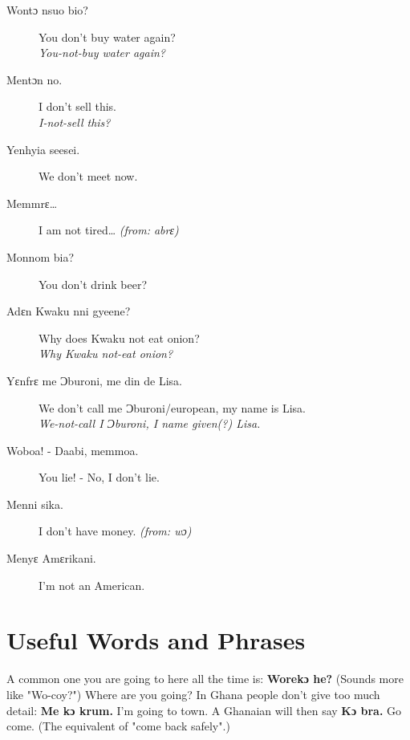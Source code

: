 \documentclass[%
 fontsize=11pt,%
 a5paper,pagesize,
 paper=a5,%
 DIV=9,%
 parskip=half*,%
 twoside=true,
 pointlessnumbers
]{scrbook}%
\begin{document}
\begin{description}
  \item[Wontɔ nsuo bio?] You don't buy water again? \\
    \textit{You-not-buy water again?}
  \item[Mentɔn no.] I don't sell this. \\
    \textit{I-not-sell this?}
  \item[Yenhyia seesei.] We don't meet now.
  \item[Memmrɛ…] I am not tired… \textit{(from: abrɛ)}
  \item[Monnom bia?] You don't drink beer?
  \item[Adɛn Kwaku nni gyeene?] Why does Kwaku not eat onion? \\
    \textit{Why Kwaku not-eat onion?}
  \item[Yɛnfrɛ me Ɔburoni, me din de Lisa.] We don't call me Ɔburoni/european, my name is Lisa. \\
    \textit{We-not-call I Ɔburoni, I name given(?) Lisa.}
  \item[Woboa! - Daabi, memmoa.] You lie! - No, I don't lie.
  \item[Menni sika.] I don't have money. \textit{(from: wɔ)}
  \item[Menyɛ Amɛrikani.] I'm not an American.
\end{description}

\chapter{Useful Words and Phrases}

A common one you are going to here all the time is: \textbf{Worekɔ he?} (Sounds more like "Wo-coy?") Where are you going? In Ghana people don’t give too much detail: \textbf{Me kɔ krum.} I’m going to town. A Ghanaian will then say \textbf{Kɔ bra.} Go come. (The equivalent of "come back safely".)
\end{document}
